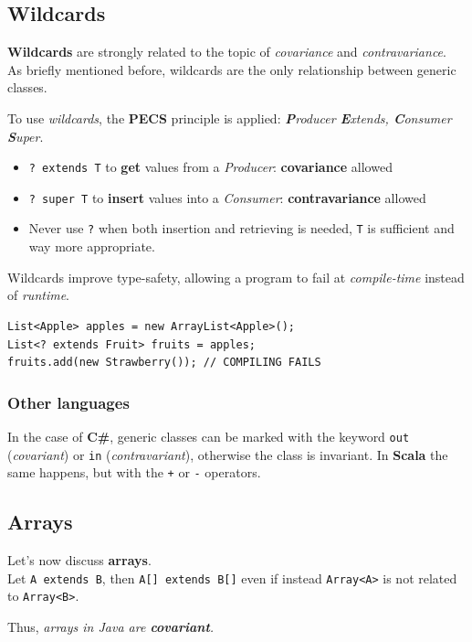 \subsection{Wildcards}
\textbf{Wildcards} are strongly related to the topic of \textit{covariance} and \textit{contravariance}.\\
As briefly mentioned before, wildcards are the only relationship between generic classes.

To use \textit{wildcards}, the \textbf{PECS} principle is applied:
\textit{\textbf{P}roducer \textbf{E}xtends, \textbf{C}onsumer \textbf{S}uper}.
\begin{itemize}
   \item \lstinline|? extends T| to \textbf{get} values from a \textit{Producer}: \textbf{covariance} allowed
   \item \lstinline|? super T| to \textbf{insert} values into a \textit{Consumer}: \textbf{contravariance} allowed
   \item Never use \lstinline|?| when both insertion and retrieving is needed, \lstinline|T| is sufficient and way more appropriate.
\end{itemize}



Wildcards improve type-safety, allowing a program to fail at \textit{compile-time} instead of \textit{runtime}.
\begin{lstlisting}
List<Apple> apples = new ArrayList<Apple>();
List<? extends Fruit> fruits = apples;
fruits.add(new Strawberry()); // COMPILING FAILS
\end{lstlisting}

\subsubsection*{Other languages}
In the case of \textbf{C\#}, generic classes can be marked with the keyword \lstinline|out| (\textit{covariant}) or \lstinline|in| (\textit{contravariant}),
otherwise the class is invariant.
In \textbf{Scala} the same happens,
but with the \lstinline|+| or \lstinline|-| operators.\nl

\subsection{Arrays}
Let's now discuss \textbf{arrays}.\\
Let \lstinline|A extends B|, then \lstinline|A[] extends B[]| even if instead \lstinline|Array<A>| is not related to \lstinline|Array<B>|.
\begin{center}
   Thus, \textit{arrays in Java are \textbf{covariant}.}
\end{center}


